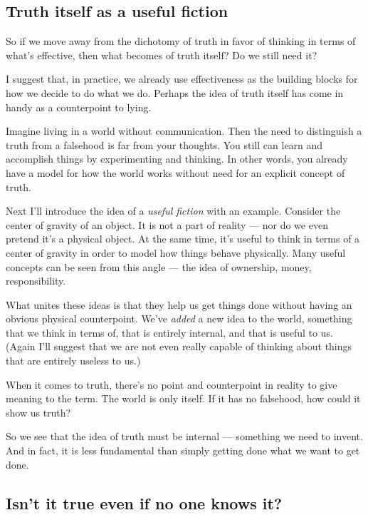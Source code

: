 \documentclass[20pt,]{extarticle}
\begin{document}
\subsection{Truth itself as a useful
fiction}\label{truth-itself-as-a-useful-fiction}

So if we move away from the dichotomy of truth in favor of thinking in
terms of what's effective, then what becomes of truth itself? Do we
still need it?

I suggest that, in practice, we already use effectiveness as the
building blocks for how we decide to do what we do. Perhaps the idea of
truth itself has come in handy as a counterpoint to lying.

Imagine living in a world without communication. Then the need to
distinguish a truth from a falsehood is far from your thoughts. You
still can learn and accomplish things by experimenting and thinking. In
other words, you already have a model for how the world works without
need for an explicit concept of truth.

Next I'll introduce the idea of a \emph{useful fiction} with an example.
Consider the center of gravity of an object. It is not a part of reality
--- nor do we even pretend it's a physical object. At the same time,
it's useful to think in terms of a center of gravity in order to model
how things behave physically. Many useful concepts can be seen from this
angle --- the idea of ownership, money, responsibility.

What unites these ideas is that they help us get things done without
having an obvious physical counterpoint. We've \emph{added} a new idea
to the world, something that we think in terms of, that is entirely
internal, and that is useful to us. (Again I'll suggest that we are not
even really capable of thinking about things that are entirely useless
to us.)

When it comes to truth, there's no point and counterpoint in reality to
give meaning to the term. The world is only itself. If it has no
falsehood, how could it show us truth?

So we see that the idea of truth must be internal --- something we need
to invent. And in fact, it is less fundamental than simply getting done
what we want to get done.

\subsection{Isn't it true even if no one knows
it?}\label{isnt-it-true-even-if-no-one-knows-it}
\end{document}
